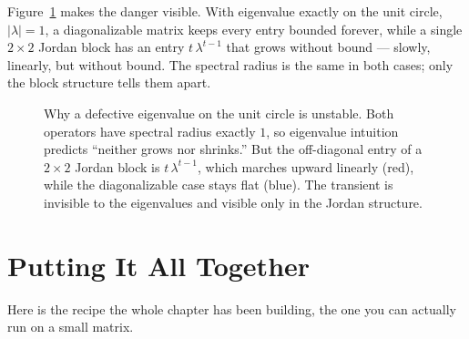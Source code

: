 Figure~\ref{ch28:transient} makes the danger visible. With eigenvalue exactly on the unit
circle, $|\lambda|=1$, a diagonalizable matrix keeps every entry bounded forever, while a
single $2\times2$ Jordan block has an entry $t\,\lambda^{t-1}$ that grows without bound ---
slowly, linearly, but without bound. The spectral radius is the same in both cases; only
the block structure tells them apart.

\begin{figure}[H]
\centering
{}
\caption{Why a defective eigenvalue on the unit circle is unstable. Both operators have
spectral radius exactly $1$, so eigenvalue intuition predicts ``neither grows nor shrinks.''
But the off-diagonal entry of a $2\times2$ Jordan block is $t\,\lambda^{t-1}$, which marches
upward linearly (red), while the diagonalizable case stays flat (blue). The transient is
invisible to the eigenvalues and visible only in the Jordan structure.}
\label{ch28:transient}
\end{figure}

\section{Putting It All Together}
\label{ch28:together}

Here is the recipe the whole chapter has been building, the one you can actually run on a
small matrix.

